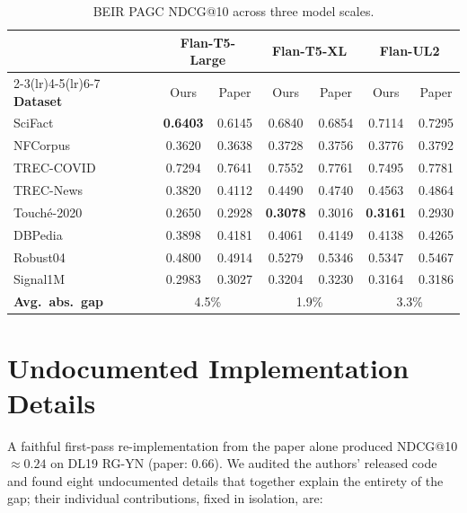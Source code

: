 \documentclass[sigconf]{acmart}
\begin{document}
\begin{table}[t]
\centering
\small
\begin{tabular}{lcccccc}
\toprule
 & \multicolumn{2}{c}{\textbf{Flan-T5-Large}}
 & \multicolumn{2}{c}{\textbf{Flan-T5-XL}}
 & \multicolumn{2}{c}{\textbf{Flan-UL2}} \\
\cmidrule(lr){2-3}\cmidrule(lr){4-5}\cmidrule(lr){6-7}
\textbf{Dataset} & Ours & Paper & Ours & Paper & Ours & Paper \\
\midrule
SciFact           & \textbf{0.6403} & 0.6145 & 0.6840 & 0.6854 & 0.7114 & 0.7295 \\
NFCorpus          & 0.3620 & 0.3638 & 0.3728 & 0.3756 & 0.3776 & 0.3792 \\
TREC-COVID        & 0.7294 & 0.7641 & 0.7552 & 0.7761 & 0.7495 & 0.7781 \\
TREC-News         & 0.3820 & 0.4112 & 0.4490 & 0.4740 & 0.4563 & 0.4864 \\
Touch\'e-2020     & 0.2650 & 0.2928 & \textbf{0.3078} & 0.3016 & \textbf{0.3161} & 0.2930 \\
DBPedia           & 0.3898 & 0.4181 & 0.4061 & 0.4149 & 0.4138 & 0.4265 \\
Robust04          & 0.4800 & 0.4914 & 0.5279 & 0.5346 & 0.5347 & 0.5467 \\
Signal1M          & 0.2983 & 0.3027 & 0.3204 & 0.3230 & 0.3164 & 0.3186 \\
\midrule
\textbf{Avg.\ abs.\ gap} & \multicolumn{2}{c}{4.5\%}
                         & \multicolumn{2}{c}{1.9\%}
                         & \multicolumn{2}{c}{3.3\%} \\
\bottomrule
\end{tabular}
\caption{BEIR PAGC NDCG@10 across three model scales.}
\label{tab:beir-pagc}
\end{table}

\section{Undocumented Implementation Details}
\label{sec:undocumented}

A faithful first-pass re-implementation from the paper alone produced
NDCG@10 $\approx 0.24$ on DL19 RG-YN (paper: 0.66). We
audited the authors' released code and found eight undocumented
details that together explain the entirety of the gap; their
individual contributions, fixed in isolation, are:
\end{document}
